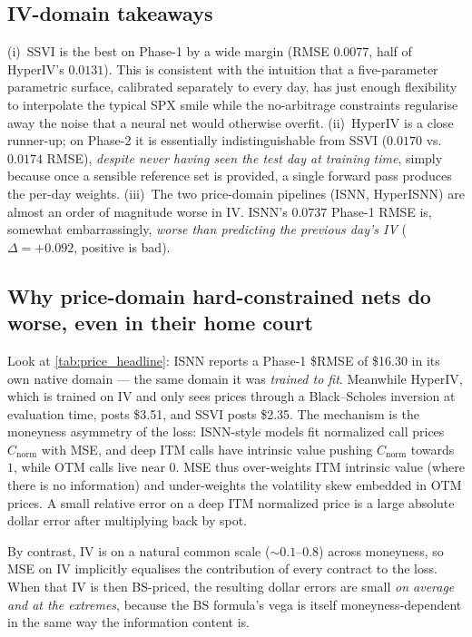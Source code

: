 \documentclass[11pt,a4paper]{article}
\begin{document}
\subsection{IV-domain takeaways}

(i)~SSVI is the best on Phase-1 by a wide margin (RMSE
$0.0077$, half of HyperIV's $0.0131$). This is consistent with the
intuition that a five-parameter parametric surface, calibrated separately
to every day, has just enough flexibility to interpolate the typical SPX
smile while the no-arbitrage constraints regularise away the noise that a
neural net would otherwise overfit. (ii)~HyperIV is a close runner-up; on
Phase-2 it is essentially indistinguishable from SSVI ($0.0170$ vs.\
$0.0174$ RMSE), \emph{despite never having seen the test day at training
time}, simply because once a sensible reference set is provided, a single
forward pass produces the per-day weights. (iii)~The two price-domain
pipelines (ISNN, HyperISNN) are almost an order of magnitude worse in IV.
ISNN's $0.0737$ Phase-1 RMSE is, somewhat embarrassingly, \emph{worse than
predicting the previous day's IV} ($\Delta = +0.092$, positive is bad).

\subsection{Why price-domain hard-constrained nets do worse, even in their
home court}

Look at \cref{tab:price_headline}: ISNN reports a Phase-1 \$RMSE of
\$16.30 in its own native domain --- the same domain it was \emph{trained
to fit}. Meanwhile HyperIV, which is trained on IV and only sees prices
through a Black--Scholes inversion at evaluation time, posts \$3.51, and
SSVI posts \$2.35. The mechanism is the moneyness asymmetry of the loss:
ISNN-style models fit normalized call prices $C_{\mathrm{norm}}$ with MSE,
and deep ITM calls have intrinsic value pushing $C_{\mathrm{norm}}$
towards $1$, while OTM calls live near $0$. MSE thus over-weights ITM
intrinsic value (where there is no information) and under-weights the
volatility skew embedded in OTM prices. A small relative error on a deep
ITM normalized price is a large absolute dollar error after multiplying
back by spot.

By contrast, IV is on a natural common scale ($\sim$$0.1$--$0.8$) across
moneyness, so MSE on IV implicitly equalises the contribution of every
contract to the loss. When that IV is then BS-priced, the resulting dollar
errors are small \emph{on average and at the extremes}, because the BS
formula's vega is itself moneyness-dependent in the same way the
information content is.
\end{document}
